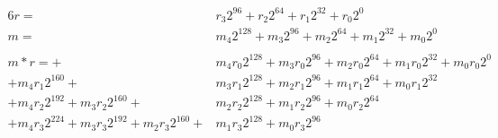 \documentclass[12pt]{article}
\begin{document}
\begin{alignat*}{6}
  r= & r_{3}2^{96} + r_{2}2^{64} + r_{1}2^{32} + r_{0}2^0\\
  m= & m_{4}2^{128} + m_{3}2^{96} + m_{2}2^{64} + m_{1}2^{32} + m_{0}2^0\\
  \\
  m \ast r =
  + & m_{4}r_{0}2^{128} +  m_{3}r_{0}2^{96}  +  m_{2}r_{0}2^{64}  +  m_{1}r_{0}2^{32}  + m_{0}r_{0}2^0\\
  +   m_{4}r_{1}2^{160} +& m_{3}r_{1}2^{128} +  m_{2}r_{1}2^{96}  +  m_{1}r_{1}2^{64}  + m_{0}r_{1}2^{32}\\
  +   m_{4}r_{2}2^{192} +  m_{3}r_{2}2^{160} +& m_{2}r_{2}2^{128} +  m_{1}r_{2}2^{96}  + m_{0}r_{2}2^{64}\\
  +   m_{4}r_{3}2^{224} +  m_{3}r_{3}2^{192} +  m_{2}r_{3}2^{160} +& m_{1}r_{3}2^{128} + m_{0}r_{3}2^{96}\\
  \\
\end{alignat*}
\end{document}
